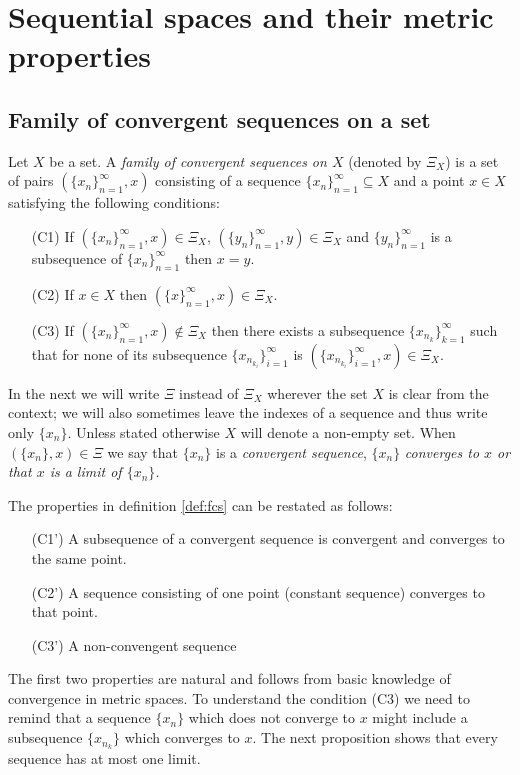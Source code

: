 \chapter{Sequential spaces and their metric properties} 

\section{Family of convergent sequences on a set}

\begin{define}\label{def:fcs}
Let $X$ be a set. A {\sl family of convergent sequences on $X$} (denoted by $\Xi_X$) is a set of pairs $(\{x_n\}^\infty_{n=1},x)$ consisting of a sequence $\{x_n\}^\infty_{n=1}\subseteq X$ and a point $x\in X$ satisfying the following conditions:
\begin{enumerate}
	\item[(C1)] If $(\{x_n\}^\infty_{n=1},x)\in\Xi_X$, $(\{y_n\}^\infty_{n=1},y)\in\Xi_X$ and $\{y_n\}^\infty_{n=1}$ is a subsequence of $\{x_n\}^\infty_{n=1}$ then $x=y$.
	\item[(C2)] If $x\in X$ then $(\{x\}^\infty_{n=1},x)\in\Xi_X$.
	\item[(C3)] If  $(\{x_n\}^\infty_{n=1},x)\notin\Xi_X$ then there exists a subsequence $\{x_{n_k}\}^\infty_{k=1}$ such that for none of its subsequence $\{x_{n_{k_i}}\}^\infty_{i=1}$ is $(\{x_{n_{k_i}}\}^\infty_{i=1},x)\in\Xi_X$.
\end{enumerate}
\end{define}

In the next we will write $\Xi$ instead of $\Xi_X$ wherever the set $X$ is clear from the context; we will also sometimes leave the indexes of a sequence and thus write only $\{x_n\}$. Unless stated otherwise $X$ will denote a non-empty set. When $(\{x_n\},x)\in\Xi$ we say that $\{x_n\}$ is a {\sl convergent sequence}, $\{x_n\}$ \sl{converges} to $x$ or that $x$ is a limit of  $\{x_n\}$.

The properties in definition \ref{def:fcs} can be restated as follows:
\begin{enumerate}
	\item[(C1')] A subsequence of a convergent sequence is convergent and converges to the same point.
	\item[(C2')] A sequence consisting of one point (constant sequence) converges to that point.
	\item[(C3')] A non-convengent sequence \tbd
\end{enumerate}
The first two properties are natural and follows from basic knowledge of convergence in metric spaces. To understand the condition (C3) we need to remind that a sequence $\{x_n\}$ which does not converge to $x$ might include a subsequence $\{x_{n_k}\}$ which converges to $x$. The next proposition shows that every sequence has at most one limit.

